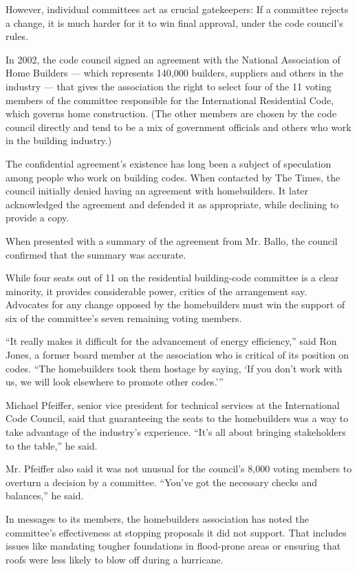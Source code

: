 However, individual committees act as crucial gatekeepers: If a
committee rejects a change, it is much harder for it to win final
approval, under the code council's rules.

In 2002, the code council signed an agreement with the National
Association of Home Builders --- which represents 140,000 builders,
suppliers and others in the industry --- that gives the association the
right to select four of the 11 voting members of the committee
responsible for the International Residential Code, which governs home
construction. (The other members are chosen by the code council directly
and tend to be a mix of government officials and others who work in the
building industry.)

The confidential agreement's existence has long been a subject of
speculation among people who work on building codes. When contacted by
The Times, the council initially denied having an agreement with
homebuilders. It later acknowledged the agreement and defended it as
appropriate, while declining to provide a copy.

When presented with a summary of the agreement from Mr. Ballo, the
council confirmed that the summary was accurate.

While four seats out of 11 on the residential building-code committee is
a clear minority, it provides considerable power, critics of the
arrangement say. Advocates for any change opposed by the homebuilders
must win the support of six of the committee's seven remaining voting
members.

``It really makes it difficult for the advancement of energy
efficiency,'' said Ron Jones, a former board member at the association
who is critical of its position on codes. ``The homebuilders took them
hostage by saying, `If you don't work with us, we will look elsewhere to
promote other codes.'''

Michael Pfeiffer, senior vice president for technical services at the
International Code Council, said that guaranteeing the seats to the
homebuilders was a way to take advantage of the industry's experience.
``It's all about bringing stakeholders to the table,'' he said.

Mr. Pfeiffer also said it was not unusual for the council's 8,000 voting
members to overturn a decision by a committee. ``You've got the
necessary checks and balances,'' he said.

In messages to its members, the homebuilders association has noted the
committee's effectiveness at stopping proposals it did not support. That
includes issues like mandating tougher foundations in flood-prone areas
or ensuring that roofs were less likely to blow off during a hurricane.

